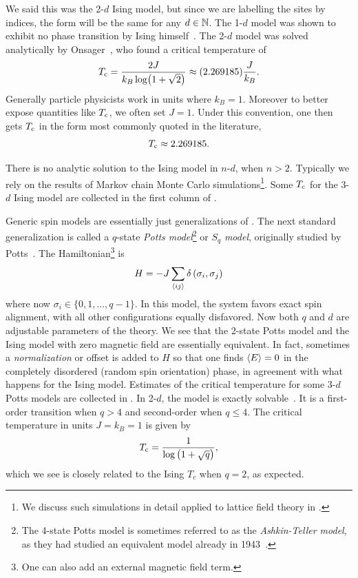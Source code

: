 We said this was the 2-$d$
Ising model, but since we are labelling the sites by indices, the form
will be the same for any $d\in\mathbb{N}$. The 1-$d$ model was shown to
exhibit no phase transition by Ising himself~\cite{ising_beitrag_1924}.
The 2-$d$ model was solved analytically by 
Onsager~\cite{onsager_crystal_1944}, who found a critical temperature of
\begin{equation}
T_{\rm c}=\frac{2 J}{k_B \log (1+\sqrt{2})}\approx(2.269185) \frac{J}{k_B}.
\end{equation}
Generally particle physicists work in units where $k_B=1$. Moreover
to better expose quantities like $T_{\rm c}$, we often set $J=1$. Under this
convention, one then gets $T_{\rm c}$ in the form most commonly quoted
in the literature,
\begin{equation}
T_{\rm c}\approx2.269185.
\end{equation}

There is no analytic solution to the Ising model in $n$-$d$, when $n>2$.
Typically we rely on the results of Markov chain Monte Carlo
simulations\footnote{We discuss such simulations in detail applied to lattice
field theory in .}. Some $T_{\rm c}$ for the 3-$d$
Ising model are collected in the first column of
. 

Generic spin models are essentially just generalizations of .
The next standard generalization is called a $q$-state
{\it Potts model}\footnote{The 4-state Potts model
is sometimes referred to as the {\it Ashkin-Teller model}, as they had studied an equivalent model already
in 1943~\cite{ashkin_statistics_1943}.} or $S_q$ {\it model}, originally studied by 
Potts~\cite{Potts:1951rk}. The Hamiltonian\footnote{One can also add 
an external magnetic field term.} is
\begin{equation}\label{eq:potts}
H=-J\sum_{\ev{i j}} \delta\left(\sigma_i, \sigma_j\right)
\end{equation}
where now $\sigma_i\in\{0,1,...,q-1\}$. In this
model, the system favors exact spin alignment, with all other configurations
equally disfavored. Now both $q$ and $d$ are adjustable parameters of the
theory. We see that the 2-state Potts model and the Ising model with
zero magnetic field are essentially equivalent. In fact, sometimes a
{\it normalization} or offset is added to $H$
so that one finds $\ev{E}=0$ in the completely disordered
(random spin orientation) phase, in agreement
with what happens for the Ising model.
Estimates of the critical temperature for some 3-$d$ Potts
models are collected in .
In 2-$d$, the model is exactly 
solvable~\cite{baxter_exactly_1982}. It is a first-order
transition when $q>4$ and second-order when $q\leq4$.
The critical temperature in units $J=k_B=1$ is given by
\begin{equation}
T_{\rm c}=\frac{1}{\log\left(1+\sqrt{q}\right)},
\end{equation}
which we see is closely related to the Ising $T_c$ when $q=2$, as expected.

